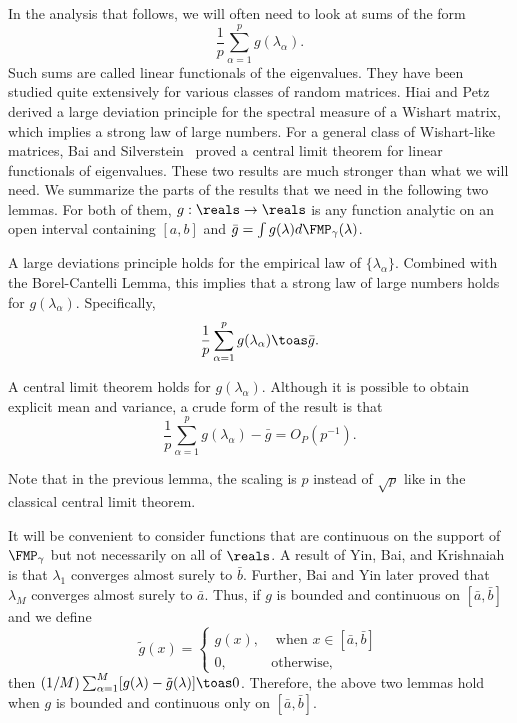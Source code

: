 In the analysis that follows, we will often need to look at sums of the form
\[
    \frac{1}{p} \sum_{\alpha=1}^p g (\lambda_\alpha).
\]
Such sums are called linear functionals of the eigenvalues.  They have been
studied quite extensively for various classes of random matrices.  Hiai and Petz~\cite{hiai1998edw} derived a large deviation principle for the spectral measure  of a Wishart matrix, which implies a strong law of large numbers.  For a  general class of Wishart-like matrices, Bai and Silverstein~\cite{bai2004clt} proved a central limit theorem for linear functionals of eigenvalues.  These two results are much stronger than what we will need.  We summarize the parts of the results that we need in the following two lemmas. For both of them, $g: \reals \to \reals$ is any function analytic on an open interval containing $[a,b]$  and $\bar g = \int g(\lambda) d\FMP_\gamma (\lambda)$.

\begin{lemma}\label{L:wishart-lln}
    A large deviations principle holds for the empirical law of 
    $\{ \lambda_\alpha \}$.  Combined with the Borel-Cantelli Lemma, this
    implies that a strong law of large numbers holds for $g(\lambda_\alpha)$. 
    Specifically,
    \[
        \frac{1}{p} \sum_{\alpha=1}^p g( \lambda_\alpha ) \toas \bar g.
    \]
\end{lemma}
    
\begin{lemma}\label{L:wishart-clt}
    A central limit theorem holds for $g(\lambda_\alpha)$.  Although it is
    possible to obtain explicit mean and variance, a crude form of the
    result is that
    \[
        \frac{1}{p} 
        \sum_{\alpha=1}^p
            g( \lambda_\alpha ) - \bar g 
        = O_P(p^{-1}).
    \]  
\end{lemma}

Note that in the previous lemma, the scaling is $p$ instead of $\sqrt{p}$ like in the classical central limit theorem.

It will be convenient to consider functions that are continuous on the support
of $\FMP_\gamma$ but not necessarily on all of $\reals$.  A result of Yin, Bai, and
Krishnaiah \cite{yin1988lle} is that $\lambda_1$ converges almost surely to
$\bar b$.  Further, Bai and Yin \cite{bai1993lse} later proved that
$\lambda_M$ converges almost surely to $\bar a$.  Thus, if $g$ is 
bounded and continuous on $[\bar a, \bar b]$ and we define 
\[
    \tilde g (x)
    =
    \begin{cases}
        g(x), &\text{ when $x \in [\bar a, \bar b]$} \\
        0,    &\text{otherwise,}
    \end{cases}
\]
then $(1/M) \sum_{\alpha=1}^M [ g(\lambda) - \tilde g (\lambda)] \toas 0$.  
Therefore, the above two lemmas hold when $g$ is bounded and continuous only
on $[\bar a, \bar b]$.

